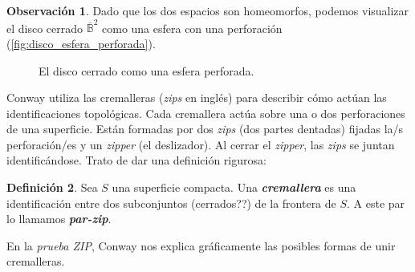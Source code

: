 \documentclass[10pt]{report}
\newcommand{\enfatiza}[1]{\textbf{\textit{#1}}}
\theoremstyle{definition}
\newtheorem{defin}{Definición}[section]
\newtheorem{obs}[defin]{Observación}
\begin{document}
\begin{obs}%
Dado que los dos espacios son homeomorfos, podemos visualizar el disco cerrado $\overline{\mathbb{B}}^2$ como una esfera con una perforación (\autoref{fig:disco_esfera_perforada}).
\end{obs}
 

\begin{figure}[h]%
\centering
{}
\caption{El disco cerrado como una esfera perforada.\label{fig:disco_esfera_perforada}}
\end{figure}


Conway utiliza las cremalleras (\textit{zips} en inglés) para describir cómo actúan las identificaciones topológicas. Cada cremallera actúa sobre una o dos perforaciones de una superficie. Están formadas por dos \textit{zips} (dos partes dentadas) fijadas la/s perforación/es y un \textit{zipper} (el deslizador). Al cerrar el \textit{zipper}, las \textit{zips} se juntan identificándose. Trato de dar una definición rigurosa:


\begin{defin}%
Sea $S$ una superficie compacta. Una \enfatiza{cremallera} es una identificación entre dos subconjuntos (cerrados??) de la frontera de $S$. A este par lo llamamos \enfatiza{par-zip}.
\end{defin}


En la \textit{prueba ZIP}, Conway nos explica gráficamente las posibles formas de unir cremalleras. 
\end{document}
